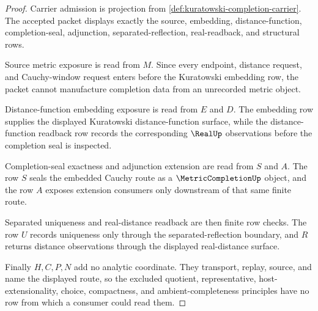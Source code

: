 \begin{proof}
Carrier admission is projection from \autoref{def:kuratowski-completion-carrier}. The accepted packet displays exactly the source, embedding, distance-function, completion-seal, adjunction, separated-reflection, real-readback, and structural rows.

Source metric exposure is read from $M$. Since every endpoint, distance request, and Cauchy-window request enters before the Kuratowski embedding row, the packet cannot manufacture completion data from an unrecorded metric object.

Distance-function embedding exposure is read from $E$ and $D$. The embedding row supplies the displayed Kuratowski distance-function surface, while the distance-function readback row records the corresponding $\RealUp$ observations before the completion seal is inspected.

Completion-seal exactness and adjunction extension are read from $S$ and $A$. The row $S$ seals the embedded Cauchy route as a $\MetricCompletionUp$ object, and the row $A$ exposes extension consumers only downstream of that same finite route.

Separated uniqueness and real-distance readback are then finite row checks. The row $U$ records uniqueness only through the separated-reflection boundary, and $R$ returns distance observations through the displayed real-distance surface.

Finally $H,C,P,N$ add no analytic coordinate. They transport, replay, source, and name the displayed route, so the excluded quotient, representative, host-extensionality, choice, compactness, and ambient-completeness principles have no row from which a consumer could read them.
\end{proof}

